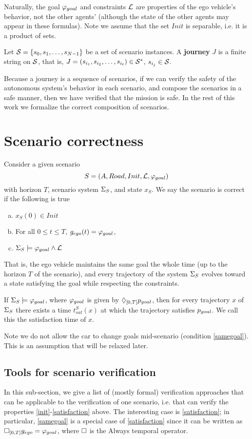 Naturally, the goal $\varphi_{goal}$ and constraints $\mathcal{L}$ are properties of the ego vehicle's behavior, not the other agents' (although the state of the other agents may appear in these formulas).
Note we assume that the set $Init$ is separable, i.e. it is a product of sets.

\begin{defn}[Journey]
Let $\mathcal{S} = \{s_0,s_1,\ldots,s_{N-1}\}$ be a set of scenario instances. 
A \textbf{journey} $J$ is a finite string on $\mathcal{S}$, that is, $J =  (s_{i_1},s_{i_2},\ldots,s_{i_t} )\in \mathcal{S}^*$, $s_{i_j} \in \mathcal{S}$.
\end{defn}

Because a journey is a sequence of scenarios, if we can verify the safety of the autonomous system's behavior in each scenario,
and compose the scenarios in a safe manner, 
then we have verified that the mission is safe.
In the rest of this work we formalize the correct composition of scenarios.

\section{Scenario correctness}
\label{sec:scenario correctness}
Consider a given scenario 
\[S = (A,Road, Init, \mathcal{L}, \varphi_{goal})\]
with horizon $T$, scenario system $\Sigma_S$, and state $x_S$.
We say the scenario is correct if the following is true
\begin{enumerate}[a.]
	\item $x_S(0) \in Init$
	\label{init}
	\item For all $0 \leq t \leq T$, $g_{ego}(t) = \varphi_{goal}$,
	\label{samegoal}
	\item $\Sigma_S \models \varphi_{goal} \wedge \mathcal{L}$
	\label{satisfaction}
\end{enumerate}
That is, the ego vehicle maintains the same goal the whole time (up to the horizon $T$ of the scenario), 
and every trajectory of the system $\Sigma_S$ evolves toward a state satisfying the goal while respecting the constraints.

If $\Sigma_S \models \varphi_{goal}$, where $\varphi_{goal}$ is given by $\Diamond_{[0,T]} p_{goal}$, then for every trajectory $x$ of $\Sigma_S$ there exists a time $t_{sat}^S(x)$ at which the trajectory satisfies $p_{goal}$.
We call this the satisfaction time of $x$.

Note we do not allow the car to change goals mid-scenario (condition \ref{samegoal}). 
This is an assumption that will be relaxed later.

\subsection{Tools for scenario verification}
In this sub-section, we give a list of (mostly formal) verification approaches that can be applicable to the verification of one scenario, i.e. that can verify the properties \ref{init}-\ref{satisfaction} above.
The interesting case is \ref{satisfaction}; in particular, \ref{samegoal} is a special case of \ref{satisfaction} since it can be written as $\square_{[0,T]} g_{ego} = \varphi_{goal}$, 
where $\square$ is the Always temporal operator.

